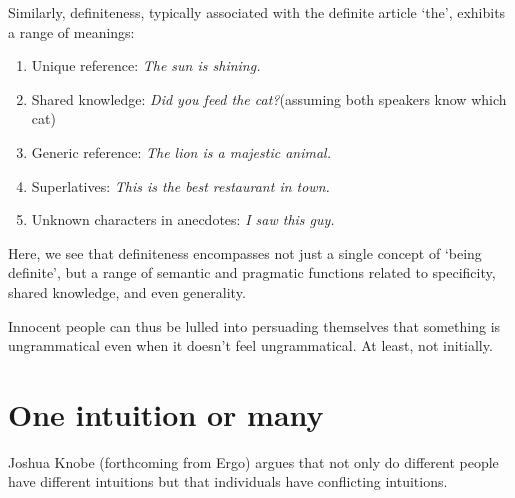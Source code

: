 Similarly, definiteness, typically associated with the definite article `the', exhibits a range of meanings:

\begin{enumerate}
    \item Unique reference: \textit{The sun is shining.}
    \item Shared knowledge: \textit{Did you feed the cat?}(assuming both speakers know which cat)
    \item Generic reference: \textit{The lion is a majestic animal.}
    \item Superlatives: \textit{This is the best restaurant in town.}
    \item Unknown characters in anecdotes: \textit{I saw this guy.}
\end{enumerate}

Here, we see that definiteness encompasses not just a single concept of `being definite', but a range of semantic and pragmatic functions related to specificity, shared knowledge, and even generality.

Innocent people can thus be lulled into persuading themselves that something is ungrammatical even when it doesn't feel ungrammatical. At least, not initially.

\section{One intuition or many}
Joshua Knobe (forthcoming from Ergo) argues that not only do different people have different intuitions but that individuals have conflicting intuitions.
